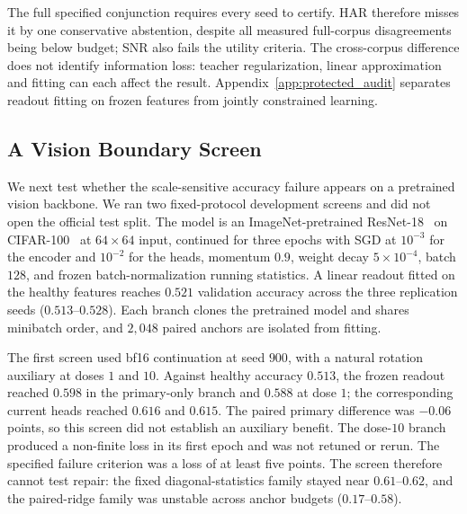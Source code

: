 \documentclass{article}
\begin{document}
The full specified conjunction requires every seed to certify. HAR therefore
misses it by one conservative abstention, despite all measured full-corpus
disagreements being below budget; SNR also fails the utility criteria. The
cross-corpus difference does not identify information loss: teacher regularization,
linear approximation and fitting can each affect the result. Appendix~\ref{app:protected_audit}
separates readout fitting on frozen features from jointly constrained learning.







\subsection{A Vision Boundary Screen}\label{app:vision_boundary}

We next test whether the scale-sensitive accuracy failure appears on a pretrained
vision backbone. We ran two fixed-protocol development screens and did not open the official test
split. The model is an
ImageNet-pretrained ResNet-18~\citep{he2016resnet} on CIFAR-100~\citep{krizhevsky2009cifar} at $64\times64$ input, continued for
three epochs with SGD at $10^{-3}$ for the encoder and $10^{-2}$ for the heads,
momentum $0.9$, weight decay $5\times10^{-4}$, batch $128$, and frozen
batch-normalization running statistics. A linear readout fitted on the healthy
features reaches $0.521$ validation accuracy across the three replication seeds
($0.513$--$0.528$). Each branch clones the pretrained model and shares minibatch
order, and $2{,}048$ paired anchors are isolated from fitting.

The first screen used bf16 continuation at seed $900$, with a natural rotation
auxiliary at doses $1$ and $10$. Against healthy accuracy $0.513$, the frozen
readout reached $0.598$ in the primary-only branch and $0.588$ at dose $1$;
the corresponding current heads reached $0.616$ and $0.615$. The paired
primary difference was $-0.06$ points, so this screen did not establish an auxiliary benefit. The
dose-$10$ branch produced a non-finite loss in its first epoch and was not
retuned or rerun. The specified failure criterion was a loss of at least five
points. The screen therefore cannot test repair: the fixed
diagonal-statistics family stayed near $0.61$--$0.62$, and the paired-ridge
family was unstable across anchor budgets ($0.17$--$0.58$).
\end{document}
